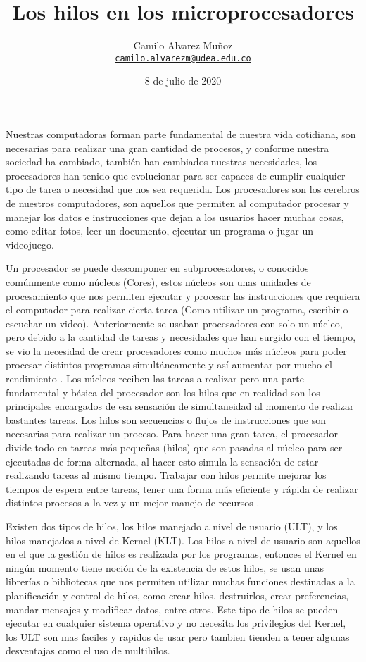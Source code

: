 \documentclass[12pt]{article}
\title{Los hilos en los microprocesadores}
\date{8 de julio de 2020}
\author{Camilo Alvarez Muñoz\\
\href{mailto:camilo.alvarezm@udea.edu.co}{\texttt{camilo.alvarezm@udea.edu.co}}}
\begin{document}
{
\maketitle}
Nuestras computadoras forman parte fundamental de nuestra vida cotidiana, son necesarias para realizar una gran cantidad de procesos, y conforme nuestra sociedad ha cambiado, también han cambiados nuestras necesidades, los procesadores han tenido que evolucionar para ser capaces de cumplir cualquier tipo de  tarea o necesidad que nos sea requerida. Los procesadores son los cerebros de nuestros computadores, son aquellos que permiten al computador procesar y manejar los datos e instrucciones que dejan a los usuarios hacer muchas cosas, como editar fotos, leer un documento, ejecutar un programa o jugar un videojuego. 

Un procesador se puede descomponer en subprocesadores, o conocidos comúnmente como núcleos (Cores), estos núcleos son unas unidades de procesamiento que nos permiten ejecutar y procesar las instrucciones que requiera el computador para realizar cierta tarea (Como utilizar un programa, escribir o escuchar un video). Anteriormente se usaban procesadores con solo un núcleo, pero debido a la cantidad de tareas y necesidades que han surgido con el tiempo, se vio la necesidad de crear procesadores como muchos más núcleos para poder procesar distintos programas simultáneamente y así aumentar por mucho el rendimiento \cite{Nucleos_e_Hilos}.
Los núcleos reciben las tareas a realizar pero una parte fundamental y básica del procesador son los hilos que en realidad son los principales encargados de esa sensación de simultaneidad al momento de realizar bastantes tareas. 
Los hilos son secuencias o flujos de instrucciones que son necesarias para realizar un proceso. Para hacer una gran tarea, el procesador divide todo  en tareas más pequeñas (hilos) que son pasadas al núcleo para ser ejecutadas de forma alternada, al hacer esto simula la sensación de estar realizando tareas al mismo tiempo. Trabajar con hilos permite mejorar los tiempos de espera entre tareas, tener una forma más eficiente y rápida de realizar distintos procesos a la vez y un mejor manejo de recursos \cite{Diferencias} .

Existen dos tipos de hilos, los hilos manejado a nivel de usuario (ULT), y los hilos manejados a nivel de Kernel (KLT).
Los hilos a nivel de usuario son aquellos en el que la gestión de hilos es realizada por los programas, entonces el Kernel en ningún momento tiene noción de la existencia de estos  hilos, se usan unas librerías o bibliotecas que nos permiten utilizar muchas funciones destinadas a la planificación y control de hilos, como crear hilos, destruirlos, crear preferencias, mandar mensajes y modificar datos, entre otros. Este tipo de hilos se pueden ejecutar en cualquier sistema operativo y no necesita los privilegios del Kernel, los ULT son mas faciles y rapidos de usar pero tambien tienden a tener algunas desventajas como el uso de multihilos.
\end{document}

